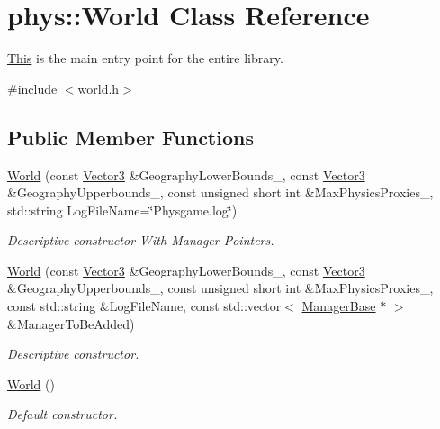 \hypertarget{classphys_1_1World}{
\section{phys::World Class Reference}
\label{da/ddf/classphys_1_1World}
}


\hyperlink{structThis}{This} is the main entry point for the entire library.  




{\ttfamily \#include $<$world.h$>$}

\subsection*{Public Member Functions}
\begin{DoxyCompactItemize}
\item 
\hyperlink{classphys_1_1World_aadca3c8024bdc520d38cbbb80dccf884}{World} (const \hyperlink{classphys_1_1Vector3}{Vector3} \&GeographyLowerBounds\_\-, const \hyperlink{classphys_1_1Vector3}{Vector3} \&GeographyUpperbounds\_\-, const unsigned short int \&MaxPhysicsProxies\_, std::string LogFileName=\char`\"{}Physgame.log\char`\"{})
\begin{DoxyCompactList}\small\item\em Descriptive constructor With Manager Pointers. \item\end{DoxyCompactList}\item 
\hyperlink{classphys_1_1World_abc302f3cbf9fe54c8d0523508ce03377}{World} (const \hyperlink{classphys_1_1Vector3}{Vector3} \&GeographyLowerBounds\_\-, const \hyperlink{classphys_1_1Vector3}{Vector3} \&GeographyUpperbounds\_\-, const unsigned short int \&MaxPhysicsProxies\_\-, const std::string \&LogFileName, const std::vector$<$ \hyperlink{classphys_1_1ManagerBase}{ManagerBase} $\ast$ $>$ \&ManagerToBeAdded)
\begin{DoxyCompactList}\small\item\em Descriptive constructor. \item\end{DoxyCompactList}\item 
\hyperlink{classphys_1_1World_a7f762724406c874250c3dc8910a1e695}{World} ()
\begin{DoxyCompactList}\small\item\em Default constructor. \item\end{DoxyCompactList}\item 

\end{DoxyCompactItemize}
